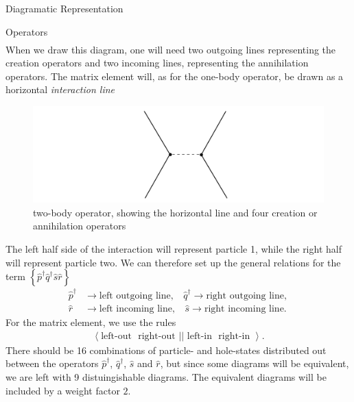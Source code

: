\documentclass[twoside,english]{uiofysmaster}
\begin{document}
\begin{chapter}{Diagramatic Representation}
\begin{section}{Operators}
\begin{align}
		\end{align}
		When we draw this diagram, one will need two outgoing lines representing the creation operators and two incoming lines, representing the annihilation operators. The matrix element will, as for the one-body operator, be drawn as a horizontal \textit{interaction line}
		\begin{figure}[H]
			\includegraphics[width=\textwidth]{Figures/TwoBodyOperator0.pdf}
			\caption{two-body operator, showing the horizontal line and four creation or annihilation operators}
			\label{Figure:TwoBodyOperator0}
		\end{figure}
		The left half side of the interaction will represent particle 1, while the right half will represent particle two. We can therefore set up the general relations for the term $\left\{ \hat p^\dagger \hat q^\dagger \hat s \hat r \right\}$
		\begin{align}
			\nonumber \hat p^\dagger &\rightarrow \text{left outgoing line}, \:\:\:\: \hat q^\dagger \rightarrow \text{right outgoing line}, \\
			\nonumber \hat r &\rightarrow \text{left incoming line}, \:\:\:\: \hat s \rightarrow \text{right incoming line}.
		\end{align}
		For the matrix element, we use the rules 
		\begin{align}
			\left< \text{left-out } \text{ right-out } | | \text{ left-in } \text{ right-in } \right>.
		\end{align}
		There should be 16 combinations of particle- and hole-states distributed out between the operators $\hat p^\dagger$, $\hat q^\dagger$, $\hat s$ and $\hat r$, but since some diagrams will be equivalent, we are left with 9 distuingishable diagrams. The equivalent diagrams will be included by a weight factor $2$. 


\end{section}
\end{chapter}
\end{document}
